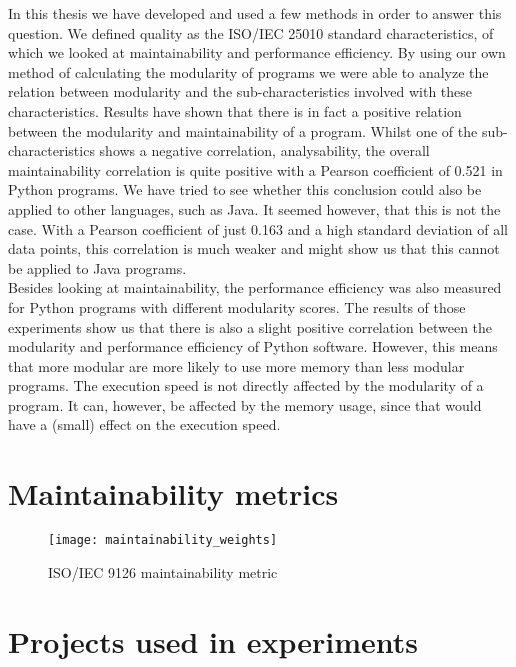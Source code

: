 \documentclass[twoside]{uva-inf-bachelor-thesis}
\begin{document}
In this thesis we have developed and used a few methods in order to answer this question. We defined quality as the ISO/IEC 25010 standard characteristics\cite{ISO25010}, of which we looked at maintainability and performance efficiency. By using our own method of calculating the modularity of programs we were able to analyze the relation between modularity and the sub-characteristics involved with these characteristics. Results have shown that there is in fact a positive relation between the modularity and maintainability of a program. Whilst one of the sub-characteristics shows a negative correlation, analysability, the overall maintainability correlation is quite positive with a Pearson coefficient of 0.521 in Python programs. We have tried to see whether this conclusion could also be applied to other languages, such as Java. It seemed however, that this is not the case. With a Pearson coefficient of just 0.163 and a high standard deviation of all data points, this correlation is much weaker and might show us that this cannot be applied to Java programs.\\

Besides looking at maintainability, the performance efficiency was also measured for Python programs with different modularity scores. The results of those experiments show us that there is also a slight positive correlation between the modularity and performance efficiency of Python software. However, this means that more modular are more likely to use more memory than less modular programs. The execution speed is not directly affected by the modularity of a program. It can, however, be affected by the memory usage, since that would have a (small) effect on the execution speed.




\begin{appendices}
\chapter{Maintainability metrics}
\label{appendix:maintainability_metrics}
\begin{figure}[H]
    \label{figure:maintainability_weights}
    \caption{ISO/IEC 9126 maintainability metric}
    \centering
        \texttt{[image: maintainability\_weights]}
\end{figure}

\chapter{Projects used in experiments}
\label{appendix:projects}

\end{appendices}
\end{document}
